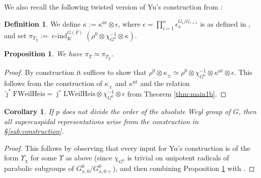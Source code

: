 \documentclass{article}
\newcommand{\eps}{\epsilon}
\DeclareMathOperator{\cind}{c-ind}
\newtheorem{pro}[thm]{Proposition}
\newtheorem{cor}[thm]{Corollary}
\theoremstyle{definition}
\newtheorem{dfn}[thm]{Definition}
\numberwithin{equation}{subsection}
\renewcommand{\-}{\hyp{}}
\begin{document}
We also recall the following twisted version of Yu's construction from \cite[Theorem~4.1.13]{FKS23}:
\begin{dfn}\label{dfn:twistedYu}
	We define $\kappa:=\kappa^{\mathrm{nt}} \otimes \eps$, where $\eps=\prod_{i=1}^n\eps_{x}^{G_i/G_{i+1}}$ is as defined in \cite[Theorem~4.1.13]{FKS23}, and set $\pi_{\Upsilon_\chi}:=\cind_K^{G(F)}(\rho^0 \otimes \chi_{G^0}^{-1} \otimes \kappa)$.
\end{dfn}


\begin{pro}\label{pro:agreeswithYu}
	We have $\pi_{\Upsilon} \simeq \pi_{\Upsilon_\chi}$.
\end{pro}
\begin{proof}
	By construction it suffices to show that $\rho^0 \otimes \kappa_{\pm} \simeq \rho^0 \otimes \chi_{G^0}^{-1} \otimes \kappa^{\mathrm{nt}} \otimes \eps$. This follows from the construction of $\kappa_{\pm}$ and $\kappa^{\mathrm{nt}}$ and the relation $\tilde\jmath^*\mathrm{FWeilHeis} = \bar\jmath^*\mathrm{LWeilHeis} \otimes \chi_{G^0}^{-1} \otimes \epsilon$ from Theorem \ref{thm:main1b}.
\end{proof}

\begin{cor}
	If $p$ does not divide the order of the absolute Weyl group of $G$, then all supercuspidal representations arise from the construction in \S\ref{sub:construction}.
\end{cor}
\begin{proof}
	This follows by observing that every input for Yu's construction is of the form $\Upsilon_\chi$ for some $\Upsilon$ as above (since $\chi_{G^0}$ is trivial on unipotent radicals of parabolic subgroups of $G^0_{x,0}/G^0_{x,0+}$), and then combining Proposition \ref{pro:agreeswithYu} with \cite[Theorem~8.1]{Fin21}.
\end{proof}
\end{document}
